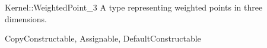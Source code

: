\begin{ccRefConcept}{Kernel::WeightedPoint_3}
A type representing weighted points in three dimensions.

\ccRefines
CopyConstructable, Assignable, DefaultConstructable

\ccSeeAlso
{} \\
 \\
 \\
 \\

\end{ccRefConcept}

